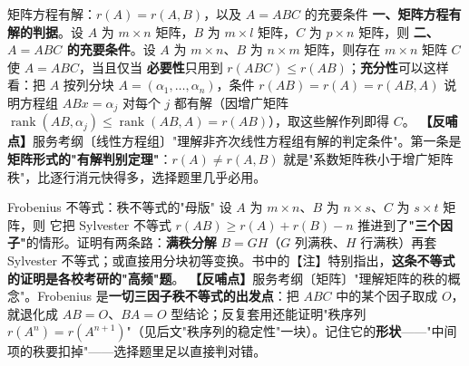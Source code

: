 \begin{fdeep}{矩阵方程有解：$r(A)=r(A,B)$，以及 $A=ABC$ 的充要条件}
\textbf{一、矩阵方程有解的判据}。设 $A$ 为 $m\times n$ 矩阵，$B$ 为 $m\times l$ 矩阵，$C$ 为 $p\times n$ 矩阵，则
\textbf{二、$A=ABC$ 的充要条件}。设 $A$ 为 $m\times n$、$B$ 为 $n\times m$ 矩阵，则存在 $m\times n$ 矩阵 $C$ 使 $A=ABC$，当且仅当
\textbf{必要性}只用到 $r(ABC)\le r(AB)$；\textbf{充分性}可以这样看：把 $A$ 按列分块 $A=(\alpha_1,\dots,\alpha_n)$，条件 $r(AB)=r(A)=r(AB,A)$ 说明方程组 $ABx=\alpha_j$ 对每个 $j$ 都有解（因增广矩阵 $\operatorname{rank}(AB,\alpha_j)\le\operatorname{rank}(AB,A)=r(AB)$），取这些解作列即得 $C$。
\textbf{【反哺点】}服务考纲〔线性方程组〕"理解非齐次线性方程组有解的判定条件"。第一条是\textbf{矩阵形式的"有解判别定理"}：$r(A)\ne r(A,B)$ 就是"系数矩阵秩小于增广矩阵秩"，比逐行消元快得多，选择题里几乎必用。
\end{fdeep}


\begin{fdeep}{Frobenius 不等式：秩不等式的"母版"}
设 $A$ 为 $m\times n$、$B$ 为 $n\times s$、$C$ 为 $s\times t$ 矩阵，则
它把 Sylvester 不等式 $r(AB)\ge r(A)+r(B)-n$ 推进到了\textbf{"三个因子"}的情形。证明有两条路：\textbf{满秩分解} $B=GH$（$G$ 列满秩、$H$ 行满秩）再套 Sylvester 不等式；或直接用分块初等变换。书中的【注】特别指出，\textbf{这条不等式的证明是各校考研的"高频"题}。
\textbf{【反哺点】}服务考纲〔矩阵〕"理解矩阵的秩的概念"。Frobenius 是\textbf{一切三因子秩不等式的出发点}：把 $ABC$ 中的某个因子取成 $O$，就退化成 $AB=O$、$BA=O$ 型结论；反复套用还能证明"秩序列 $r(A^{n})=r(A^{n+1})$"（见后文"秩序列的稳定性"一块）。记住它的\textbf{形状}——"中间项的秩要扣掉"——选择题里足以直接判对错。
\end{fdeep}


